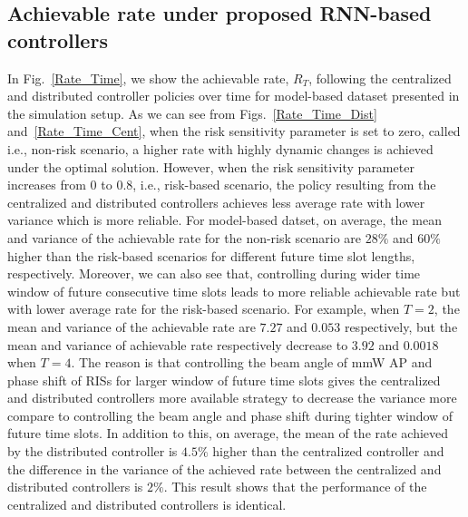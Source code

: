 \documentclass[conference]{IEEEtran}
\begin{document}
\subsection{Achievable rate under proposed RNN-based controllers}
In Fig.~\ref{Rate_Time}, we show the achievable rate, $R_T$, following the centralized and distributed controller policies over time for model-based dataset presented in the simulation setup. As we can see from Figs.~\ref{Rate_Time_Dist} and~\ref{Rate_Time_Cent}, when the risk sensitivity parameter is set to zero, called i.e., non-risk scenario, a higher rate with highly dynamic changes is achieved under the optimal solution. However, when the risk sensitivity parameter increases from $0$ to $0.8$, i.e., risk-based scenario, the policy resulting from the centralized and distributed controllers achieves less average rate with lower variance which is more reliable. For model-based datset, on average, the mean and variance of the achievable rate for the non-risk scenario are $28\%$ and $60\%$ higher than the risk-based scenarios for different future time slot lengths, respectively. Moreover, we can also see that, controlling during wider time window of future consecutive time slots leads to more reliable achievable rate but with lower average rate for the risk-based scenario. For example, when $T=2$, the mean and variance of the achievable rate are $7.27$ and $0.053$ respectively, but the mean and variance of achievable rate respectively decrease to $3.92$ and $0.0018$ when $T=4$. The reason is that controlling the beam angle of mmW AP and phase shift of RISs for larger window of future time slots gives the centralized and distributed controllers more available strategy to decrease the variance more compare to controlling the beam angle and phase shift during tighter window of future time slots. In addition to this, on average, the mean of the rate achieved by the distributed controller is $4.5\%$ higher than the centralized controller and the difference in the variance of the achieved rate between the centralized and distributed controllers is $2\%$. This result shows that the performance of the centralized and distributed controllers is identical.
\end{document}
